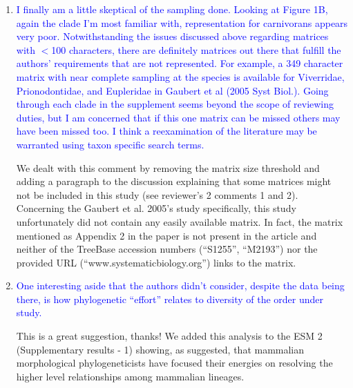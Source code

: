 \documentclass[12pt,letterpaper]{article}
\begin{document}
\begin{enumerate}
\item{\textcolor{blue}{I finally am a little skeptical of the sampling done. Looking at Figure 1B, again the clade I'm most familiar with, representation for carnivorans appears very poor. Notwithstanding the issues discussed above regarding matrices with $<$100 characters, there are definitely matrices out there that fulfill the authors' requirements that are not represented. For example, a 349 character matrix with near complete sampling at the species is available for Viverridae, Prionodontidae, and Eupleridae in Gaubert et al (2005 Syst Biol.). Going through each clade in the supplement seems beyond the scope of reviewing duties, but I am concerned that if this one matrix can be missed others may have been missed too. I think a reexamination of the literature may be warranted using taxon specific search terms.}}

We dealt with this comment by removing the matrix size threshold and adding a paragraph to the discussion explaining that some matrices might not be included in this study (see reviewer's 2 comments 1 and 2).
Concerning the Gaubert et al. 2005's study specifically, this study unfortunately did not contain any easily available matrix.
In fact, the matrix mentioned as Appendix 2 in the paper is not present in the article and neither of the TreeBase accession numbers (``S1255'', ``M2193'') nor the provided URL (``www.systematicbiology.org'') links to the matrix.

\item{\textcolor{blue}{One interesting aside that the authors didn't consider, despite the data being there, is how phylogenetic ``effort'' relates to diversity of the order under study.}}

This is a great suggestion, thanks!
We added this analysis to the ESM 2 (Supplementary results - 1) showing, as suggested, that mammalian morphological phylogeneticists have focused their energies on resolving the higher level relationships among mammalian lineages.

\end{enumerate}

\end{document}
